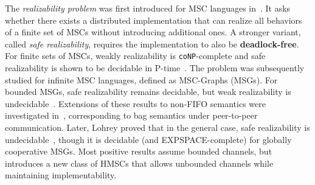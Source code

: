 The \emph{realizability problem} was first introduced for MSC languages 
in~\cite{alur2000inference,alur2003inference}. It asks whether there exists a distributed 
implementation that can realize all behaviors of a finite set of MSCs 
without introducing additional ones. A stronger variant, called 
\emph{safe realizability}, requires the implementation to also be \textbf{deadlock-free}. 
For finite sets of MSCs, weakly realizability is \verb|coNP|-complete and safe 
realizability is shown to be decidable in P-time~\cite{alur2005realizability}.
The problem was subsequently studied for infinite MSC languages, defined 
as MSC-Graphs (MSGs). For bounded MSGs, safe realizability 
remains decidable, but weak realizability 
is undecidable~\cite{alur2005realizability}. Extensions of these results to non-FIFO 
semantics were investigated in~\cite{morin2002recognizable}, corresponding 
to bag semantics under peer-to-peer communication. 
Later, Lohrey proved that in the general case, safe realizability 
is undecidable~\cite{lohrey2003realizability}, though it is decidable (and 
EXPSPACE-complete) for globally cooperative MSGs.
Most positive results assume bounded channels, but \cite{bollig2025high} introduces 
a new class of HMSCs that allows unbounded channels while maintaining implementability.



